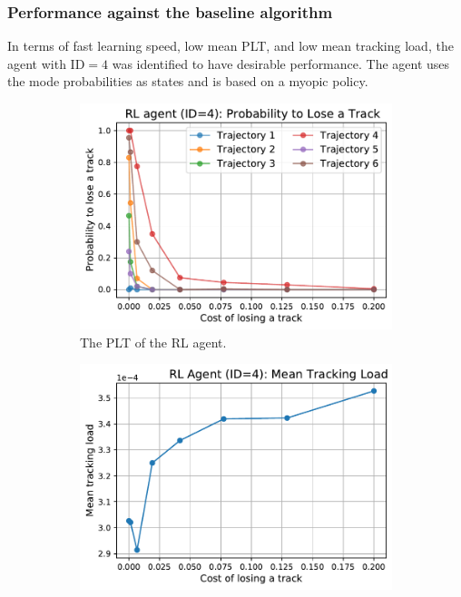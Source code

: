 \documentclass[english, 12pt, a4paper, elec, utf8, a-1b, online]{aaltothesis}
\numberwithin{equation}{section}
\begin{document}
\subsubsection{Performance against the baseline algorithm} \label{sec:against_baseline}


In terms of fast learning speed, low mean PLT, and low mean tracking load, the agent with $\text{ID}=4$ was identified to have desirable performance.
The agent uses the mode probabilities as states and is based on a myopic policy.

\begin{figure}
    \centering
    \begin{subfigure}[b]{0.45\textwidth}
        \includegraphics[width=\linewidth]{figures/benchmark/Simulations/plt_agent.pdf}
        \caption{The PLT of the RL agent.}
        \label{fig:penalty_plt}
    \end{subfigure}
    \hfill
    \begin{subfigure}[b]{0.45\textwidth}
        \includegraphics[width=\linewidth]{figures/benchmark/Simulations/tracking_load_agent.pdf}

\end{subfigure}
\end{figure}
\end{document}
